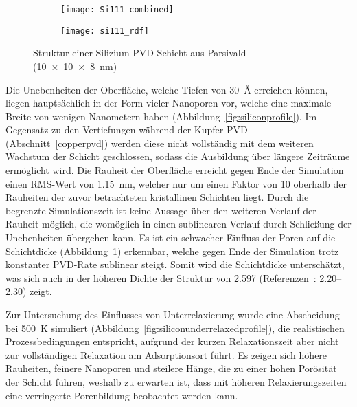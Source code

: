 \begin{figure}[t]
  \captionsetup[subfigure]{singlelinecheck=false}
  \def\subfigwidth{0.48\textwidth}
  \begin{subfigure}[t]{\subfigwidth}
    \texttt{[image: Si111\_combined]}
    \label{fig:siliconresults-a}
  \end{subfigure}
  \hfill
  \begin{subfigure}[t]{\subfigwidth}
    \texttt{[image: si111\_rdf]}
    \label{fig:siliconresults-b}
  \end{subfigure}
  \caption[Struktur einer Silizium-PVD-Schicht aus Parsivald]{
    Struktur einer Silizium-PVD-Schicht aus Parsivald (\SI{10x10x8}{\nano\meter})
  }
  \label{fig:siliconresults}
\end{figure}

Die Unebenheiten der Oberfläche, welche Tiefen von \SI{30}{\angstrom} erreichen können, liegen hauptsächlich in der Form vieler Nanoporen vor, welche eine maximale Breite von wenigen Nanometern haben (Abbildung~\ref{fig:siliconprofile}).
Im Gegensatz zu den Vertiefungen während der Kupfer-PVD (Abschnitt~\ref{copperpvd}) werden diese nicht vollständig mit dem weiteren Wachstum der Schicht geschlossen, sodass die Ausbildung über längere Zeiträume ermöglicht wird.
Die Rauheit der Oberfläche erreicht gegen Ende der Simulation einen RMS-Wert von \SI{1.15}{\nano\meter}, welcher nur um einen Faktor von \num{10} oberhalb der Rauheiten der zuvor betrachteten kristallinen Schichten liegt.
Durch die begrenzte Simulationszeit ist keine Aussage über den weiteren Verlauf der Rauheit möglich, die womöglich in einen sublinearen Verlauf durch Schließung der Unebenheiten übergehen kann.
Es ist ein schwacher Einfluss der Poren auf die Schichtdicke (Abbildung~\ref{fig:siliconresults-a}) erkennbar, welche gegen Ende der Simulation trotz konstanter PVD-Rate sublinear steigt.
Somit wird die Schichtdicke unterschätzt, was sich auch in der höheren Dichte der Struktur von \SI{2.597}{\gpcc} (Referenzen~\cite{remes_optical_1998,renner_density_1973}: \SIrange{2.20}{2.30}{\gpcc}) zeigt.

Zur Untersuchung des Einflusses von Unterrelaxierung wurde eine Abscheidung bei \SI{500}{\kelvin} simuliert (Abbildung~\ref{fig:siliconunderrelaxedprofile}), die realistischen Prozessbedingungen entspricht, aufgrund der kurzen Relaxationszeit aber nicht zur vollständigen Relaxation am Adsorptionsort führt.
Es zeigen sich höhere Rauheiten, feinere Nanoporen und steilere Hänge, die zu einer hohen Porösität der Schicht führen, weshalb zu erwarten ist, dass mit höheren Relaxierungszeiten eine verringerte Porenbildung beobachtet werden kann.

